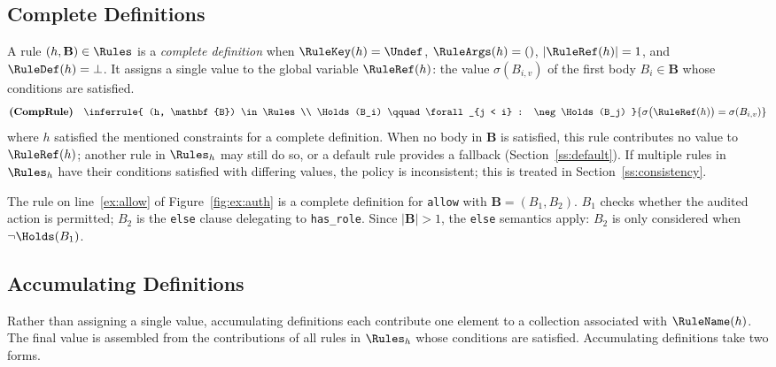 \subsection{Complete Definitions}
\label{ss:complete}


A rule $(h, \mathbf{B}) \in \Rules$ is a \emph{complete definition} when $\RuleKey(h) = \Undef$,
$\RuleArgs(h) = ()$, $|\RuleRef(h)| = 1$, and $\RuleDef(h) = \bot$.
It assigns a single value to the global variable $\RuleRef(h)$: the value $\sigma(B_{i,v})$
of the first body $B_i \in \mathbf{B}$ whose conditions are satisfied.
\[
\textbf{(CompRule)}\quad
\inferrule{
  (h, \mathbf{B}) \in \Rules \\
  \Holds(B_i) \qquad \forall_{j < i} : \neg\Holds(B_j)
}{
  \sigma\bigl(\RuleRef(h)\bigr) = \sigma(B_{i,v})
}
\]
where $h$ satisfied the mentioned constraints for a complete definition.
When no body in $\mathbf{B}$ is satisfied, this rule contributes no value to $\RuleRef(h)$;
another rule in $\Rules_h$ may still do so, or a default rule provides a fallback
(Section~\ref{ss:default}).
If multiple rules in $\Rules_h$ have their conditions satisfied with differing values,
the policy is inconsistent; this is treated in Section~\ref{ss:consistency}.

\begin{example}
  The rule on line~\ref{ex:allow} of Figure~\ref{fig:ex:auth} is a complete definition
  for \texttt{allow} with $\mathbf{B} = (B_1, B_2)$.
  $B_1$ checks whether the audited action is permitted; $B_2$ is the \texttt{else} clause
  delegating to \texttt{has\_role}.
  Since $|\mathbf{B}| > 1$, the \texttt{else} semantics apply: $B_2$ is only considered
  when $\neg\Holds(B_1)$.
\end{example}


\subsection{Accumulating Definitions}
\label{ss:accum}


Rather than assigning a single value, accumulating definitions each contribute one element
to a collection associated with $\RuleName(h)$.
The final value is assembled from the contributions of all rules in $\Rules_h$ whose
conditions are satisfied.
Accumulating definitions take two forms.

